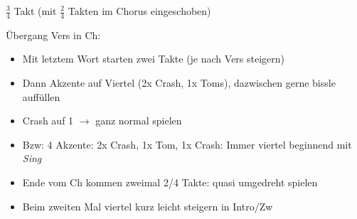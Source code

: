 
$\frac{3}{4}$ Takt (mit $\frac{2}{4}$ Takten im Chorus eingeschoben)

Übergang Vers in Ch:
\begin{itemize}
	\item Mit letztem Wort starten zwei Takte (je nach Vers steigern)
	\item Dann Akzente auf Viertel (2x Crash, 1x Toms), dazwischen gerne bissle auffüllen
	\item Crash auf 1 $\rightarrow$ ganz normal spielen
	\item Bzw: 4 Akzente: 2x Crash, 1x Tom, 1x Crash: Immer viertel beginnend mit \textit{Sing}
	\item Ende vom Ch kommen zweimal 2/4 Takte: quasi umgedreht spielen
	\item Beim zweiten Mal viertel kurz leicht steigern in Intro/Zw
\end{itemize}

